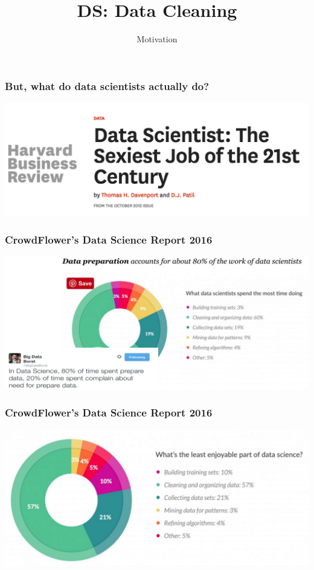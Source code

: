 \documentclass[aspectratio=169]{../latex_main/tntbeamer}  %
\title[Data Cleaning]{DS: Data Cleaning}
\subtitle{Motivation}
\begin{document}
	
	\maketitle


\begin{frame}[c]
    \frametitle{But, what do data scientists actually do?}

    \centering
    \includegraphics[width=1.0\textwidth]{bild1_harvard}
    
\end{frame}

\begin{frame}[c]
    \frametitle{CrowdFlower’s Data Science Report 2016}

     \includegraphics[width=1.0\textwidth]{bild2_data_prep}
    
\end{frame}

\begin{frame}[c]
    \frametitle{CrowdFlower’s Data Science Report 2016}

    \includegraphics[width=1.0\textwidth]{bild3_least_enjoyable_thing}
\end{frame}
\end{document}
